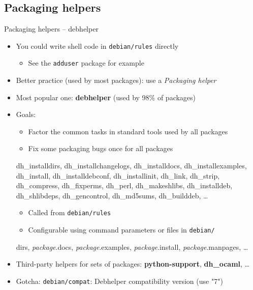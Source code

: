 \documentclass[10pt,final]{beamer}
\begin{document}
\subsection{Packaging helpers}
\begin{frame}{Packaging helpers -- debhelper}
  \begin{itemize}
  \item You could write shell code in \texttt{debian/rules} directly
    \begin{itemize}
    \item See the \texttt{adduser} package for example
    \end{itemize}
    \hbr
  \item Better practice (used by most packages): use a \textsl{Packaging helper}
    \hbr
  \item Most popular one: \textbf{debhelper} (used by 98\% of packages)
    \hbr
  \item Goals:
    \begin{itemize}
    \item Factor the common tasks in standard tools used by all packages
    \item Fix some packaging bugs once for all packages
    \end{itemize}
    {\footnotesize dh\_installdirs, dh\_installchangelogs, dh\_installdocs,
      dh\_installexamples, dh\_install, dh\_installdebconf, dh\_installinit,
      dh\_link, dh\_strip, dh\_compress, dh\_fixperms, dh\_perl,
      dh\_makeshlibs, dh\_installdeb, dh\_shlibdeps, dh\_gencontrol,
      dh\_md5sums, dh\_builddeb, \ldots}
    \begin{itemize}
    \item Called from \texttt{debian/rules}
    \item Configurable using command parameters or files in \texttt{debian/}
    \end{itemize}
    {\footnotesize \ttfamily dirs, \textsl{package}.docs, \textsl{package}.examples,
      \textsl{package}.install, \textsl{package}.manpages, \ldots} \hbr
  \item Third-party helpers for sets of packages: \textbf{python-support},
    \textbf{dh\_ocaml}, \ldots \hbr
  \item Gotcha: \texttt{debian/compat}: Debhelper compatibility version (use "7")
  \end{itemize}
\end{frame}
\end{document}
